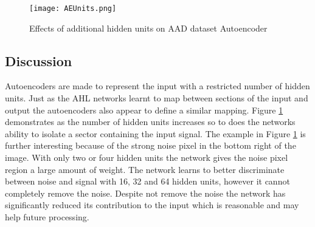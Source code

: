 \begin{figure}[h]
    \centering
    \texttt{[image: AEUnits.png]}
    \caption{Effects of additional hidden units on AAD dataset Autoencoder}
    \label{fig:AEUnits}
\end{figure}


\subsection{Discussion}
Autoencoders are made to represent the input with a restricted number of hidden units.
Just as the AHL networks learnt to map between sections of the input and output the autoencoders also appear to define a similar mapping. 
Figure \ref{fig:AEUnits} demonstrates as the number of hidden units increases so to does the networks ability to isolate a sector containing the input signal.
The example in Figure \ref{fig:AEUnits} is further interesting because of the strong noise pixel in the bottom right of the image. 
With only two or four hidden units the network gives the noise pixel region a large amount of weight.
The network learns to better discriminate between noise and signal with 16, 32 and 64 hidden units, however it cannot completely remove the noise.
Despite not remove the noise the network has significantly reduced its contribution to the input which is reasonable and may help future processing. 
